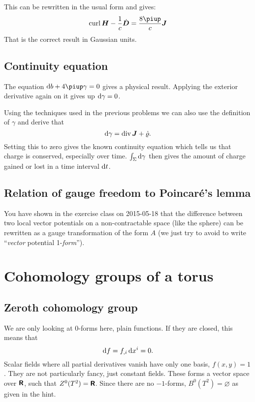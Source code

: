 \documentclass[11pt, english, fleqn, DIV=15, headinclude, BCOR=1cm]{scrartcl}
\begin{document}
This can be rewritten in the usual form and gives:
\[
    \curl \vec H - \frac 1c \dot{\vec D} = \frac{8\piup}{c} \vec J
\]
That is the correct result in Gaussian units.

\subsection{Continuity equation}

The equation $\dif b + 4 \piup \gamma = 0$ gives a physical result. Applying
the exterior derivative again on it gives up $\mathop{}\!\mathrm d \gamma = 0$.

Using the techniques used in the previous problems we can also use the
definition of $\gamma$ and derive that
\[
    \mathop{}\!\mathrm d \gamma = \operatorname{div} \boldsymbol{J} + \dot\varrho.
\]
Setting this to zero gives the known continuity equation which tells us that
charge is conserved, especially over time. $\int_\Sigma \mathop{}\!\mathrm d \gamma$ then gives
the amount of charge gained or lost in a time interval $\mathop{}\!\mathrm d t$.

\subsection{Relation of gauge freedom to Poincaré's lemma}

You have shown in the exercise class on 2015-05-18 that the difference between
two local vector potentials on a non-contractable space (like the sphere) can
be rewritten as a gauge transformation of the form $A$ (we just try to avoid to
write “\emph{vector} potential 1-\emph{form}”).


\section{Cohomology groups of a torus}
\label{homework:2}

\subsection{Zeroth cohomology group}

We are only looking at 0-forms here, plain functions. If they are closed, this
means that
\[
    \mathop{}\!\mathrm d f = f_{,i} \mathop{}\!\mathrm d x^i = 0.
\]
Scalar fields where all partial derivatives vanish have only one basis, $f(x,
y) = 1$. They are not particularly fancy, just constant fields. These forms a
vector space over $\text{\bfseries\sffamily R}$, such that $Z^0(T^2) = \text{\bfseries\sffamily R}$. Since there are no
$-1$-forms, $B^0(T^2) = \varnothing$ as given in the hint.
\end{document}
